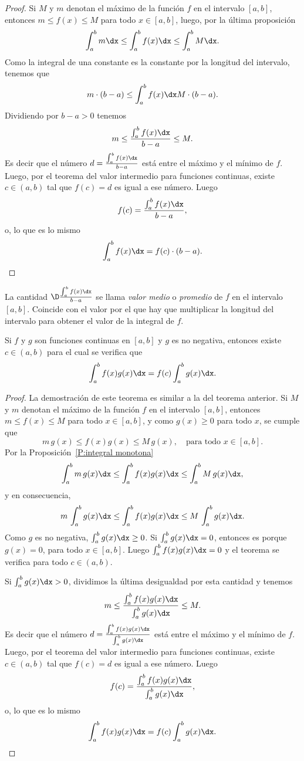 \begin{proof}
  Si $M$ y $m$ denotan el máximo de la función $f$ en el intervalo $[a,b]$, entonces $m\le f(x)\le M$ para todo $x\in[a,b]$, luego, por la última proposición
  \[
  \int_a^b m\dx
  \le \int_a^b f(x)\dx
  \le \int_a^b M\dx.
  \]
  Como la integral de una constante es la constante por la longitud del intervalo, tenemos que
  \[
    m\cdot(b-a)
    \le \int_a^b f(x)\dx
    M\cdot(b-a).
  \]
  Dividiendo por $b-a>0$ tenemos
  \[
  m \le \frac{\int_a^b f(x)\dx}{b-a}\le M.
  \]
  Es decir que el número $d=\frac{\int_a^b f(x)\dx}{b-a}$ está entre el máximo y el mínimo de $f$. Luego, por el teorema del valor intermedio para funciones continuas, existe $c\in(a,b)$ tal que $f(c)=d$ es igual a ese número. Luego
  \[
  f(c) = \frac{\int_a^b f(x)\dx}{b-a},
  \]
  o, lo que es lo mismo
  \[
  \int_a^b f(x)\dx = f(c)\cdot(b-a).
  \qedhere
  \]
\end{proof}

\begin{remark}
  La cantidad $\D \frac{\int_a^b f(x)\dx}{b-a}$ se llama \emph{valor medio} o \emph{promedio} de $f$ en el intervalo $[a,b]$. Coincide con el valor por el que hay que multiplicar la longitud del intervalo para obtener el valor de la integral de $f$.
\end{remark}

\begin{theorem}\label{T:TVM-integral-generalizado}
Si $f$ y $g$ son funciones continuas en $[a,b]$ y $g$ es no negativa, entonces existe $c\in(a,b)$ para el cual se verifica que
\[
\int_a^b f(x)g(x)\dx = f(c) \int_a^b g(x)\dx.
\] 
\end{theorem}

\begin{proof}
  La demostración de este teorema es similar a la del teorema anterior. 
  Si $M$ y $m$ denotan el máximo de la función $f$ en el intervalo $[a,b]$, entonces $m\le f(x)\le M$ para todo $x\in[a,b]$, y como $g(x)\ge 0$ para todo $x$, se cumple que
  \[
  m\,g(x)\le f(x)g(x)\le M\,g(x), \quad\text{para todo $x\in[a,b]$.}
  \]
  Por la Proposición~\ref{P:integral monotona}
  \[
  \int_a^b m\,g(x)\dx
  \le \int_a^b f(x)g(x)\dx
  \le \int_a^b M\,g(x)\dx,
  \]
  y en consecuencia,
  \[
    m\,\int_a^b g(x)\dx
  \le \int_a^b f(x)g(x)\dx
  \le M\,\int_a^b g(x)\dx.
  \]
  Como $g$ es no negativa, $\int_a^b g(x)\dx\ge 0$. 
  Si $\int_a^b g(x)\dx=0$, entonces es porque $g(x)=0$, para todo $x\in[a,b]$.
  Luego $\int_a^b f(x)g(x)\dx=0$ y el teorema se verifica para todo $c\in(a,b)$.
  
  Si $\int_a^b g(x)\dx > 0$, dividimos la última desigualdad por esta cantidad y tenemos
  \[
    m
    \le \frac{\int_a^b f(x)g(x)\dx}{\int_a^b g(x)\dx}
    \le M.
  \]
  Es decir que el número $d=\frac{\int_a^b f(x)g(x)\dx}{\int_a^b g(x)\dx}$ está entre el máximo y el mínimo de $f$. Luego, por el teorema del valor intermedio para funciones continuas, existe $c\in(a,b)$ tal que $f(c)=d$ es igual a ese número. Luego
  \[
  f(c) = \frac{\int_a^b f(x)g(x)\dx}{\int_a^b g(x)\dx},
  \]
  o, lo que es lo mismo
  \[
  \int_a^b f(x)g(x)\dx = f(c)\int_a^b g(x)\dx.
  \qedhere
  \]
\end{proof}

